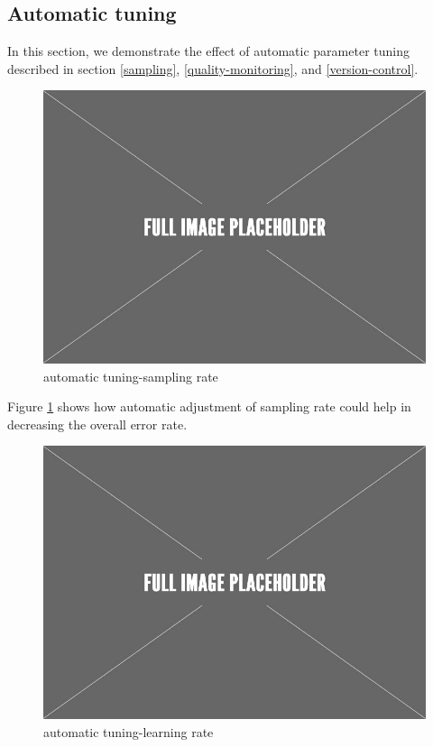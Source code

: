 \documentclass{sig-alternate-05-2015}
\begin{document}
\subsection{Automatic tuning}
In this section, we demonstrate the effect of automatic parameter tuning described in section \ref{sampling}, \ref{quality-monitoring}, and \ref{version-control}. 

\begin{figure}[h]
\centering
\includegraphics[width=\columnwidth]{../images/placeholder.jpeg}
\caption{automatic tuning-sampling rate}
\label{fig:tuning-sampling-rate}
\end{figure}

Figure \ref{fig:tuning-sampling-rate} shows how automatic adjustment of sampling rate could help in decreasing the overall error rate.

\begin{figure}[h]
\centering
\includegraphics[width=\columnwidth]{../images/placeholder.jpeg}
\caption{automatic tuning-learning rate}
\label{fig:tuning-learning-rate}
\end{figure}
\end{document}
